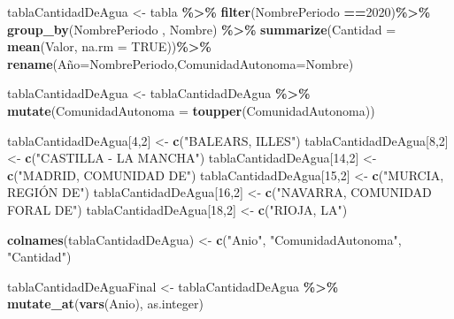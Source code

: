 \documentclass[
]{article}
\newenvironment{Shaded}{\begin{snugshade}}{\end{snugshade}}
\newcommand{\AttributeTok}[1]{\textcolor[rgb]{0.13,0.29,0.53}{#1}}
\newcommand{\ConstantTok}[1]{\textcolor[rgb]{0.56,0.35,0.01}{#1}}
\newcommand{\DecValTok}[1]{\textcolor[rgb]{0.00,0.00,0.81}{#1}}
\newcommand{\FunctionTok}[1]{\textcolor[rgb]{0.13,0.29,0.53}{\textbf{#1}}}
\newcommand{\NormalTok}[1]{#1}
\newcommand{\OtherTok}[1]{\textcolor[rgb]{0.56,0.35,0.01}{#1}}
\newcommand{\SpecialCharTok}[1]{\textcolor[rgb]{0.81,0.36,0.00}{\textbf{#1}}}
\newcommand{\StringTok}[1]{\textcolor[rgb]{0.31,0.60,0.02}{#1}}
\begin{document}
\begin{Shaded}
\begin{Highlighting}[]
\NormalTok{tablaCantidadDeAgua }\OtherTok{\textless{}{-}}\NormalTok{ tabla }\SpecialCharTok{\%\textgreater{}\%}
  \FunctionTok{filter}\NormalTok{(NombrePeriodo  }\SpecialCharTok{==}\DecValTok{2020}\NormalTok{)}\SpecialCharTok{\%\textgreater{}\%}
  \FunctionTok{group\_by}\NormalTok{(NombrePeriodo  , Nombre) }\SpecialCharTok{\%\textgreater{}\%}
  \FunctionTok{summarize}\NormalTok{(}\AttributeTok{Cantidad =} \FunctionTok{mean}\NormalTok{(Valor, }\AttributeTok{na.rm =} \ConstantTok{TRUE}\NormalTok{))}\SpecialCharTok{\%\textgreater{}\%}
  \FunctionTok{rename}\NormalTok{(Año}\OtherTok{=}\NormalTok{NombrePeriodo,}\AttributeTok{ComunidadAutonoma=}\NormalTok{Nombre)}

\NormalTok{tablaCantidadDeAgua }\OtherTok{\textless{}{-}}\NormalTok{ tablaCantidadDeAgua }\SpecialCharTok{\%\textgreater{}\%}
  \FunctionTok{mutate}\NormalTok{(}\AttributeTok{ComunidadAutonoma =} \FunctionTok{toupper}\NormalTok{(ComunidadAutonoma))}

\NormalTok{tablaCantidadDeAgua[}\DecValTok{4}\NormalTok{,}\DecValTok{2}\NormalTok{] }\OtherTok{\textless{}{-}} \FunctionTok{c}\NormalTok{(}\StringTok{"BALEARS, ILLES"}\NormalTok{)}
\NormalTok{tablaCantidadDeAgua[}\DecValTok{8}\NormalTok{,}\DecValTok{2}\NormalTok{] }\OtherTok{\textless{}{-}} \FunctionTok{c}\NormalTok{(}\StringTok{"CASTILLA {-} LA MANCHA"}\NormalTok{)}
\NormalTok{tablaCantidadDeAgua[}\DecValTok{14}\NormalTok{,}\DecValTok{2}\NormalTok{] }\OtherTok{\textless{}{-}} \FunctionTok{c}\NormalTok{(}\StringTok{"MADRID, COMUNIDAD DE"}\NormalTok{)}
\NormalTok{tablaCantidadDeAgua[}\DecValTok{15}\NormalTok{,}\DecValTok{2}\NormalTok{] }\OtherTok{\textless{}{-}} \FunctionTok{c}\NormalTok{(}\StringTok{"MURCIA, REGIÓN DE"}\NormalTok{)}
\NormalTok{tablaCantidadDeAgua[}\DecValTok{16}\NormalTok{,}\DecValTok{2}\NormalTok{] }\OtherTok{\textless{}{-}} \FunctionTok{c}\NormalTok{(}\StringTok{"NAVARRA, COMUNIDAD FORAL DE"}\NormalTok{)}
\NormalTok{tablaCantidadDeAgua[}\DecValTok{18}\NormalTok{,}\DecValTok{2}\NormalTok{] }\OtherTok{\textless{}{-}} \FunctionTok{c}\NormalTok{(}\StringTok{"RIOJA, LA"}\NormalTok{)}

\FunctionTok{colnames}\NormalTok{(tablaCantidadDeAgua) }\OtherTok{\textless{}{-}} \FunctionTok{c}\NormalTok{(}\StringTok{"Anio"}\NormalTok{, }\StringTok{"ComunidadAutonoma"}\NormalTok{, }\StringTok{"Cantidad"}\NormalTok{)}

\NormalTok{tablaCantidadDeAguaFinal }\OtherTok{\textless{}{-}}\NormalTok{ tablaCantidadDeAgua }\SpecialCharTok{\%\textgreater{}\%}
  \FunctionTok{mutate\_at}\NormalTok{(}\FunctionTok{vars}\NormalTok{(Anio), as.integer)}
\end{Highlighting}
\end{Shaded}
\end{document}

